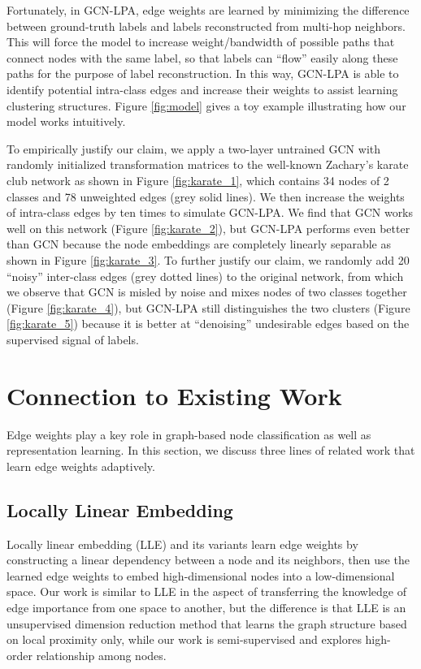 \documentclass{article}
\begin{document}
		Fortunately, in GCN-LPA, edge weights are learned by minimizing the difference between ground-truth labels and labels reconstructed from multi-hop neighbors.
		This will force the model to increase weight/bandwidth of possible paths that connect nodes with the same label, so that labels can ``flow'' easily along these paths for the purpose of label reconstruction.
		In this way, GCN-LPA is able to identify potential intra-class edges and increase their weights to assist learning clustering structures.
		Figure \ref{fig:model} gives a toy example illustrating how our model works intuitively.
		
		To empirically justify our claim, we apply a two-layer untrained GCN with randomly initialized transformation matrices to the well-known Zachary's karate club network \citep{zachary1977information} as shown in Figure \ref{fig:karate_1}, which contains 34 nodes of 2 classes and 78 unweighted edges (grey solid lines).
		We then increase the weights of intra-class edges by ten times to simulate GCN-LPA.
		We find that GCN works well on this network (Figure \ref{fig:karate_2}), but GCN-LPA performs even better than GCN because the node embeddings are completely linearly separable as shown in Figure \ref{fig:karate_3}.
		To further justify our claim, we randomly add 20 ``noisy'' inter-class edges (grey dotted lines) to the original network, from which we observe that GCN is misled by noise and mixes nodes of two classes together (Figure \ref{fig:karate_4}), but GCN-LPA still distinguishes the two clusters (Figure \ref{fig:karate_5}) because it is better at ``denoising'' undesirable edges based on the supervised signal of labels.


\section{Connection to Existing Work}
\label{sec:existing_work}
	Edge weights play a key role in graph-based node classification as well as representation learning.
	In this section, we discuss three lines of related work that learn edge weights adaptively.
	
	\subsection{Locally Linear Embedding}
		Locally linear embedding (LLE) \citep{roweis2000nonlinear} and its variants \citep{zhang2007mlle, kong2012iterative} learn edge weights by constructing a linear dependency between a node and its neighbors, then use the learned edge weights to embed high-dimensional nodes into a low-dimensional space.
		Our work is similar to LLE in the aspect of transferring the knowledge of edge importance from one space to another, but the difference is that LLE is an unsupervised dimension reduction method that learns the graph structure based on local proximity only, while our work is semi-supervised and explores high-order relationship among nodes.
	
\end{document}
